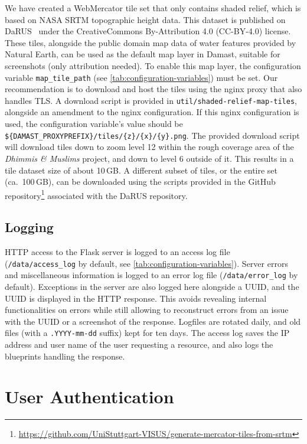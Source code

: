 We have created a WebMercator tile set that only contains shaded relief, which is based on NASA SRTM topographic height data.
This dataset is published on DaRUS~\cite{SRTM-tiles} under the CreativeCommons By-Attribution 4.0 (CC-BY-4.0) license.
These tiles, alongside the public domain map data of water features provided by Natural Earth, can be used as the default map layer in Damast, suitable for screenshots (only attribution needed).
To enable this map layer, the configuration variable \verb!map_tile_path! (see \cref{tab:configuration-variables}) must be set.
Our recommendation is to download and host the tiles using the nginx proxy that also handles TLS.
A download script is provided in \verb!util/shaded-relief-map-tiles!, alongside an amendment to the nginx configuration.
If this nginx configuration is used, the configuration variable's value should be \verb!${DAMAST_PROXYPREFIX}/tiles/{z}/{x}/{y}.png!.
The provided download script will download tiles down to zoom level 12 within the rough coverage area of the \emph{Dhimmis \& Muslims} project, and down to level 6 outside of it.
This results in a tile dataset size of about 10\,GB.
A different subset of tiles, or the entire set (ca.\ 100\,GB), can be downloaded using the scripts provided in the GitHub repository\footnote{\url{https://github.com/UniStuttgart-VISUS/generate-mercator-tiles-from-srtm}} associated with the DaRUS repository.


\subsection{Logging}
\label{sec:logging}

HTTP access to the Flask server is logged to an access log file (\verb!/data/access_log! by default, see \cref{tab:configuration-variables}).
Server errors and miscellaneous information is logged to an error log file (\verb!/data/error_log! by default).
Exceptions in the server are also logged here alongside a UUID, and the UUID is displayed in the HTTP response.
This avoids revealing internal functionalities on errors while still allowing to reconstruct errors from an issue with the UUID or a screenshot of the response.
Logfiles are rotated daily, and old files (with a \verb!.YYYY-mm-dd! suffix) kept for ten days.
The access log saves the IP address and user name of the user requesting a resource, and also logs the blueprints handling the response.


\section{User Authentication}
\label{sec:user-authentication}

